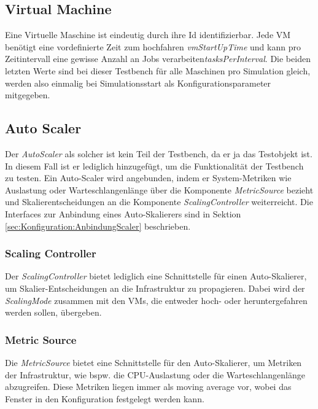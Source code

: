 \newpage

\subsection{Virtual Machine}
\label{sec:aufbau:VM}
Eine Virtuelle Maschine ist eindeutig durch ihre Id identifizierbar. Jede VM benötigt eine vordefinierte Zeit zum hochfahren \textit{vmStartUpTime} und kann pro Zeitintervall eine gewisse Anzahl an Jobs verarbeiten\textit{tasksPerInterval}. Die beiden letzten Werte sind bei dieser Testbench für alle Maschinen pro Simulation gleich, werden also einmalig bei Simulationsstart als Konfigurationsparameter mitgegeben.





\subsection{Auto Scaler}
Der \textit{AutoScaler} als solcher ist kein Teil der Testbench, da er ja das Testobjekt ist. In diesem Fall ist er lediglich hinzugefügt, um die Funktionalität der Testbench zu testen. Ein Auto-Scaler wird angebunden, indem er System-Metriken wie Auslastung oder Warteschlangenlänge über die Komponente \textit{MetricSource} bezieht und Skalierentscheidungen an die Komponente \textit{ScalingController} weiterreicht. Die Interfaces zur Anbindung eines Auto-Skalierers sind in Sektion \ref{sec:Konfiguration:AnbindungScaler} beschrieben.



\subsubsection{Scaling Controller}
Der \textit{ScalingController} bietet lediglich eine Schnittstelle für einen Auto-Skalierer, um Skalier-Entscheidungen an die Infrastruktur zu propagieren. Dabei wird der \textit{ScalingMode} zusammen mit den VMs, die entweder hoch- oder heruntergefahren werden sollen, übergeben.


\subsubsection{Metric Source}
Die \textit{MetricSource} bietet eine Schnittstelle für den Auto-Skalierer, um Metriken der Infrastruktur, wie bspw. die CPU-Auslastung oder die Warteschlangenlänge abzugreifen. Diese Metriken liegen immer als moving average vor, wobei das Fenster in den Konfiguration festgelegt werden kann.



